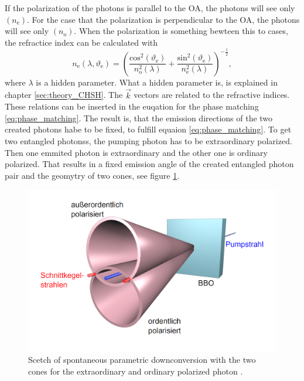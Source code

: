 If the polarization of the photons is parallel to the OA, the photons will see only $(n_{\mathrm{e}})$. 
For the case that the polarization is perpendicular to the OA, the photons will see only $(n_{\mathrm{o}})$. When the polarization is something bewteen this to cases, the refractice index can be calculated with
\begin{equation}
    n_{\mathrm{e}}(\lambda, \vartheta_{\mathrm{e}}) 
    = \left( 
    \frac{\mathrm{cos}^2(\vartheta_{\mathrm{e}})}{n_{\mathrm{o}}^2(\lambda)} 
    + \frac{\mathrm{sin}^2(\vartheta_{\mathrm{e}})}{n_{\mathrm{e}}^2(\lambda)}
    \right)^{-\frac{1}{2}},
\end{equation}
where $\lambda$ is a hidden parameter. What a hidden parameter is, is explained in chapter \ref{sec:theory_CHSH}.  
The $\vec{k}$ vectors are related to the refractive indices. These relations can be inserted in the euqation for the phase matching \eqref{eq:phase_matching}. The result is, that the emission directions of the two created photons habe to be fixed, to fulfill equaion \eqref{eq:phase_matching}. To get two entangled photonss, the pumping photon has to be extraordinary polarized. Then one emmited photon is extraordinary and the other one is ordinary polarized. That results in a fixed emission angle of the created entangled photon pair and the geomytry of two cones, see figure \ref{fig:theory_cones}. 
\begin{figure}[H]
\centering
\includegraphics[scale=0.2]{figures/2_kegel.PNG}
\caption{Scetch of spontaneous parametric downconversion with the two cones for the extraordinary and ordinary polarized photon \cite{barz}.   }
\label{fig:theory_cones}
\end{figure}


